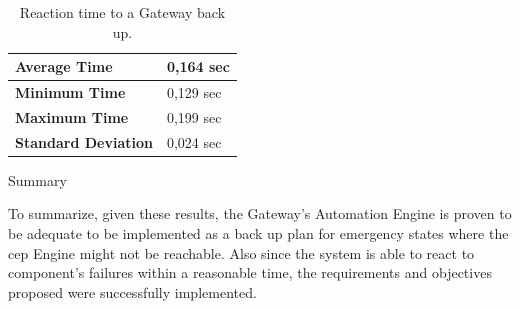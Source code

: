 \begin{table}[H]
	
	\begin{tabular}{|l|l|}
		\hline
		\textbf{Average Time}       & 0,164 sec \\ \hline
		\textbf{Minimum Time}       & 0,129 sec \\ \hline
		\textbf{Maximum Time}       & 0,199 sec \\ \hline
		\textbf{Standard Deviation} & 0,024 sec \\ \hline
	\end{tabular}
	\centering
	\caption{Reaction time to a Gateway back up.}
	\label{gwup}
\end{table}

\newpage
\begin{Paragraph}{Summary}
	
	
	
To summarize, given these results, the Gateway's Automation Engine is proven to be adequate to be implemented as a back up plan for emergency states where the \ac{cep} Engine might not be reachable. Also since the system is able to react to component's failures within a reasonable time, the requirements and objectives proposed were successfully implemented.  

\end{Paragraph}
